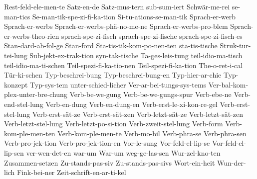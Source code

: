 {	     Rest-feld-ele-men-te
Satz-en-de
Satz-mus-tern
             sub-sum-iert
Schwär-me-rei
se-man-tics
Se-man-tik-spe-zi-fi-ka-tion
	     Si-tu-ations-se-man-tik
Sprach-er-werb
Sprach-er-werbs
Sprach-er-werbs-phä-no-me-ne
Sprach-er-werbs-pro-blem
Sprach-er-werbs-theo-rien
sprach-spe-zi-fisch
sprach-spe-zi-fische
sprach-spe-zi-fisch-es
             Stan-dard-ab-fol-ge
Stan-ford
Sta-tis-tik-kom-po-nen-ten
sta-tis-tische
Struk-tur-tei-lung
Sub-jekt-ex-trak-tion
             syn-tak-tische
Ta-ges-leis-tung
teil-idio-ma-tisch
teil-idio-ma-ti-schen
             Teil-spezi-fi-ka-tio-nen
             Teil-spezi-fi-ka-tion
The-o-ret-i-cal
Tür-ki-schen
             Typ-beschrei-bung
             Typ-beschrei-bung-en
             Typ-hier-ar-chie
             Typ-konzept
             Typ-sys-tem
	     unter-schied-licher
Ver-ar-bei-tungs-sys-tems
             Ver-bal-kom-plex-unter-bre-chung
Verb-be-we-gung
Verb-be-we-gungs-spur
Verb-ebe-ne
             Verb-end-stel-lung
             Verb-en-dung
             Verb-en-dung-en
Verb-erst-le-xi-kon-re-gel
	     Verb-erst-stel-lung
Verb-erst-sät-ze
Verb-erst-sät-zen
Verb-letzt-sät-ze
Verb-letzt-sät-zen
Verb-letzt-stel-lung
Verb-letzt-po-si-tion
	     Verb-zweit-stel-lung
             Verb-form
             Verb-kom-ple-men-ten
             Verb-kom-ple-men-te
Verb-mo-bil
             Verb-phra-se
             Verb-phra-sen
Verb-pro-jek-tion
Verb-pro-jek-tion-en
             Vor-le-sung
             Vor-feld-el-lip-se
             Vor-feld-el-lip-sen
	     ver-wen-det-en
             war-um
             War-um
weg-ge-las-sen
             Wur-zel-kno-ten
             Zusammen-setzen
             Zu-stands-pas-siv
             Zu-stands-pas-sivs
Wort-ein-heit
Wun-der-lich
Fink-bei-ner
Zeit-schrift-en-ar-ti-kel
}